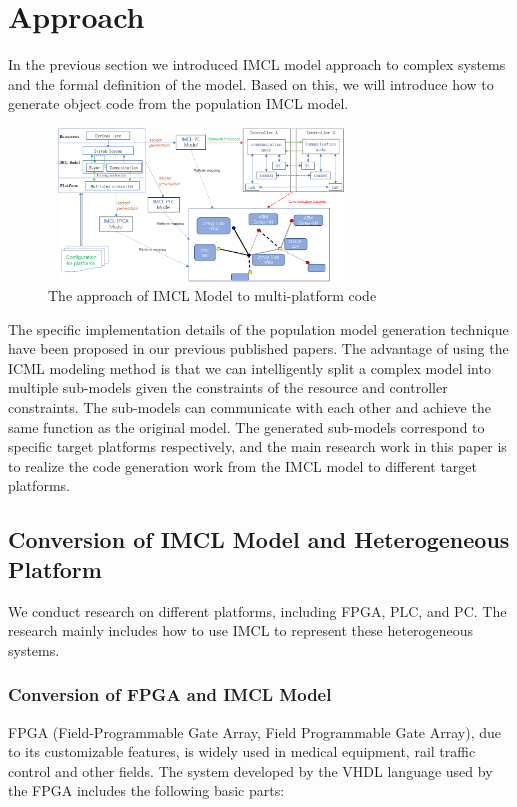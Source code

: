 \section{Approach}
In the previous section we introduced IMCL model approach to complex systems and the formal definition of the model. Based on this, we will introduce how to generate object code from the population IMCL model.

\begin{figure}[!htb]
  \centering
        \includegraphics[height=1.6in, width=3.2in]{approach}
  \caption{The approach of IMCL Model to multi-platform code}\label{approach}
\end{figure}

The specific implementation details of the population model generation technique have been proposed in our previous published papers. The advantage of using the ICML modeling method is that we can intelligently split a complex model into multiple sub-models given the constraints of the resource and controller constraints. The sub-models can communicate with each other and achieve the same function as the original model. The generated sub-models correspond to specific target platforms respectively, and the main research work in this paper is to realize the code generation work from the IMCL model to different target platforms.


\subsection{Conversion of IMCL Model and Heterogeneous Platform}
We conduct research on different platforms, including FPGA, PLC, and PC. The research mainly includes how to use IMCL to represent these heterogeneous systems.

\subsubsection{\textbf{Conversion of FPGA and IMCL Model}}
FPGA (Field-Programmable Gate Array, Field Programmable Gate Array), due to its customizable features, is widely used in medical equipment, rail traffic control and other fields. The system developed by the VHDL language used by the FPGA includes the following basic parts:

